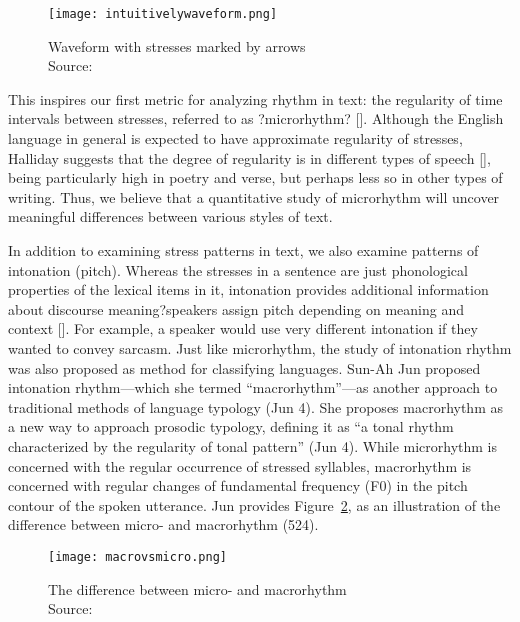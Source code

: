 \documentclass[pageno]{jpaper}
\newcommand{\quotes}[1]{``#1''}
\begin{document}
\begin{figure}[hbt]
\centering
\texttt{[image: intuitivelywaveform.png]}
\caption{Waveform with stresses marked by arrows \\ Source:}
\label{fig:intuitively}
\end{figure}

This inspires our first metric for analyzing rhythm in text: the regularity of time intervals between stresses, referred to as ?microrhythm? []. Although the English language in general is expected to have approximate regularity of stresses, Halliday suggests that the degree of regularity is in different types of speech [], being particularly high in poetry and verse, but perhaps less so in other types of writing. Thus, we believe that a quantitative study of microrhythm will uncover meaningful differences between various styles of text. 

In addition to examining stress patterns in text, we also examine patterns of intonation (pitch). Whereas the stresses in a sentence are just phonological properties of the lexical items in it, intonation provides additional information about discourse meaning?speakers assign pitch depending on meaning and context []. For example, a speaker would use very different intonation if they wanted to convey sarcasm. Just like microrhythm, the study of intonation rhythm was also proposed as method for classifying languages. Sun-Ah Jun proposed intonation rhythm---which she termed \quotes{macrorhythm}---as another approach to traditional methods of language typology (Jun 4). She proposes macrorhythm as a new way to approach prosodic typology, defining it as \quotes{a tonal rhythm characterized by the regularity of tonal pattern} (Jun 4). While microrhythm is concerned with the regular occurrence of stressed syllables, macrorhythm is concerned with regular changes of fundamental frequency (F0) in the pitch contour of the spoken utterance. Jun provides Figure~\ref{fig:macrovsmicro}, as an illustration of the difference between micro- and macrorhythm (524). 

\begin{figure}[hbt]
\centering
\texttt{[image: macrovsmicro.png]}
\caption{The difference between micro- and macrorhythm \\ Source:}
\label{fig:macrovsmicro}
\end{figure}
\end{document}
